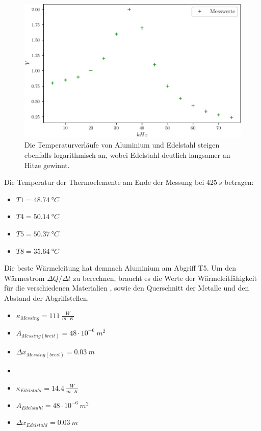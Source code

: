 \begin{figure}
    \centering
    \includegraphics{build/plot2.pdf}
    \caption{Die Temperaturverläufe von Aluminium und Edelstahl steigen ebenfalls logarithmisch an, wobei Edelstahl deutlich langsamer an Hitze gewinnt.}
    \label{fig:45grad2}
\end{figure}
\newpage
Die Temperatur der Thermoelemente am Ende der Messung bei $425\ s$ betragen:

\begin{itemize}
    \centering
    \item[] $T1 = 48.74\ °C$ 
    \item[] $T4 = 50.14\ °C$
    \item[] $T5 = 50.37\ °C$
    \item[] $T8 = 35.64\ °C$
\end{itemize}

Die beste Wärmeleitung hat demnach Aluminium am Abgriff T5.
\newpage
Um den Wärmestrom $\Delta Q/\Delta t$ zu berechnen, braucht es die Werte der Wärmeleitfähigkeit für die verschiedenen Materialien \cite{web}, sowie den Querschnitt der Metalle und den Abstand der Abgriffstellen.
\begin{itemize}
    \item[] $\kappa_{Messing} = 111\ \frac{W}{m\cdot K}$
    \item[] $A_{Messing(breit)} = 48\cdot 10^{-6}\ m^2$
    \item[] $\Delta x_{Messing(breit)} = 0.03\ m$ 
    \item[] 
    \item[] $\kappa_{Edelstahl} = 14.4\ \frac{W}{m\cdot K}$
    \item[] $A_{Edelstahl} = 48\cdot 10^{-6}\ m^2$
    \item[] $\Delta x_{Edelstahl} = 0.03\ m$ 
\end{itemize}
